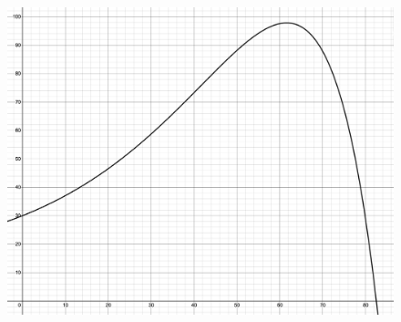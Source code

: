 \begin{example}
\begin{enumerate}[leftmargin=*]
\begin{figure}[h!]
        \includegraphics[scale=0.15]{images/netChange/birdPopulation2.png}
    \end{figure}


\end{enumerate}
\end{example}
